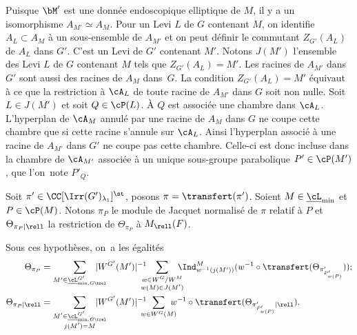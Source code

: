 Puisque $\bM'$ est une donnée endoscopique elliptique de $M$, il y a un isomorphisme $A_{M'}\simeq A_{M}$. Pour un Levi $L$ de $G$ contenant $M$, on identifie $A_{L}\subset A_{M}$ à un sous-ensemble de $A_{M'}$ et on peut définir le commutant $Z_{G'}(A_{L})$ de $A_{L}$ dans $G'$. C'est un Levi de $G'$ contenant $M'$. Notons $J(M')$ l'ensemble des Levi $L$ de $G$ contenant $M$ tels que $Z_{G'}(A_{L})=M'$.
Les racines de $A_{M'}$ dans $G'$ sont aussi des racines de $A_{M}$ dans~$G$. La condition $Z_{G'}(A_{L})=M'$ équivaut à ce que la restriction à $\cA_{L}$ de toute racine de $A_{M'}$ dans $G$ soit non nulle. Soit $L\in J(M')$ et soit $Q\in \cP(L)$. À $Q$ est associée une chambre dans $\cA_{L}$. L'hyperplan de $\cA_{M}$ annulé par une racine de $A_{M}$ dans $G$ ne coupe cette chambre que si cette racine s'annule sur $\cA_{L}$. Ainsi l'hyperplan associé à une racine de $A_{M'}$ dans $G'$ ne coupe pas cette chambre. Celle-ci est donc incluse dans la chambre de $\cA_{M'}$ associée à un unique sous-groupe parabolique $P'\in \cP(M')$, que l'on~note $P'_{Q}$.

Soit $\pi'\in \CC[ \Irr(G')_{\lambda_{1}}]^{\st}$, posons $\pi=\transfert(\pi')$. Soient $M\in \underline{\cL}_{\min}$ et
$P\in \cP(M)$. Notons $\pi_{P}$ le module de Jacquet normalisé de $\pi$ relatif à $P$ et $ \Theta_{\pi_{P}\vert\rell}$ la restriction de $\Theta_{\pi_{P}}$ à $M_{\rell}(F)$.

\begin{prop*}
Sous ces hypothèses, on~a les égalités
\begin{align*}
\Theta_{\pi_{P}}&=\sum_{M'\in \underline{\cL}_{\min, G\trel}^{G'}}\hspace*{-5mm}\vert W^{G'}(M')\vert ^{-1}\hspace*{-3mm}\sum_{\substack{w\in W^G/W^M\\w(M)\in J(M')}}\hspace*{-3mm}\Ind_{w^{-1}(j(M'))}^M(w^{-1}\circ \transfert(\Theta_{\pi'_{P'_{w(P)}}}));\\
\Theta_{\pi_{P}\vert\rell}&=\sum_{\substack{M'\in \underline{\cL}_{\min,G\trel}^{G'}\\ j(M')= M}}\hspace*{-5mm}\vert W^{G'}(M')\vert ^{-1}\hspace*{-3mm}\sum_{w\in W^{G}(M)}\hspace*{-3mm}w^{-1}\circ \transfert(\Theta_{\pi'_{P'_{w(P)}}\vert\rell}).
\end{align*}
\end{prop*}

